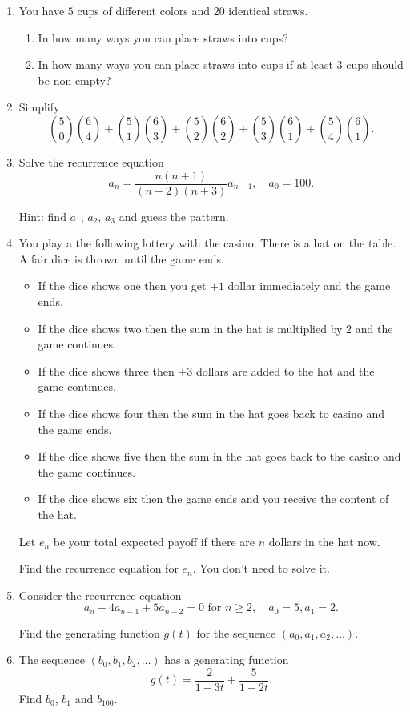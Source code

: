 \documentclass[12pt]{article}
\begin{document}
\begin{enumerate}

    \item You have $5$ cups of different colors and $20$ identical straws. 
    \begin{enumerate}
        \item In how many ways you can place straws into cups?
        \item In how many ways you can place straws into cups if at least $3$ cups should be non-empty?
    \end{enumerate}

    \item Simplify 
    \[
    {5 \choose 0}{6 \choose 4} + {5 \choose 1}{6 \choose 3} + {5 \choose 2}{6 \choose 2} + {5 \choose 3}{6 \choose 1} + {5 \choose 4}{6 \choose 1}.
    \]


    \item Solve the recurrence equation 
    \[
        a_n = \frac{n (n+1)}{(n+2)(n+3)} a_{n-1}, \quad a_0 = 100.
    \]

    Hint: find $a_1$, $a_2$, $a_3$ and guess the pattern. 

    \item You play a the following lottery with the casino. There is a hat on the table. 
A fair dice is thrown until the game ends. 
\begin{itemize}
    \item If the dice shows one then you get $+1$ dollar immediately and the game ends. 
    \item If the dice shows two then the sum in the hat is multiplied by $2$ and the game continues. 
    \item If the dice shows three then $+3$ dollars are added to the hat and the game continues.
    \item If the dice shows four then the sum in the hat goes back to casino and the game ends.
    \item If the dice shows five then the sum in the hat goes back to the casino and the game continues.
    \item If the dice shows six then the game ends and you receive the content of the hat. 
\end{itemize}

Let $e_n$ be your total expected payoff if there are $n$ dollars in the hat now. 

Find the recurrence equation for $e_n$. You don't need to solve it. 

    \item Consider the recurrence equation 
    \[
    a_n - 4a_{n-1} + 5a_{n-2} = 0 \text{ for } n\geq 2, \quad a_0 = 5, a_1 = 2.
    \]

    Find the generating function $g(t)$ for the sequence $(a_0, a_1, a_2, \dots)$. 

    \item The sequence $(b_0, b_1, b_2, \dots)$ has a generating function 
    \[
    g(t) = \frac{2}{1-3t} + \frac{5}{1-2t}.
    \]
    Find $b_0$, $b_1$ and $b_{100}$.

\end{enumerate}
\end{document}
